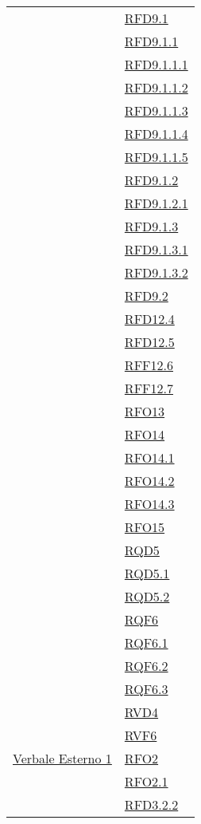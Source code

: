 \begin{longtable}{|>{\centering}m{5cm}|m{5cm}<{\centering}|}
& \hyperlink{RFD9.1}{RFD9.1}\\
& \hyperlink{RFD9.1.1}{RFD9.1.1}\\
& \hyperlink{RFD9.1.1.1}{RFD9.1.1.1}\\
& \hyperlink{RFD9.1.1.2}{RFD9.1.1.2}\\
& \hyperlink{RFD9.1.1.3}{RFD9.1.1.3}\\
& \hyperlink{RFD9.1.1.4}{RFD9.1.1.4}\\
& \hyperlink{RFD9.1.1.5}{RFD9.1.1.5}\\
& \hyperlink{RFD9.1.2}{RFD9.1.2}\\
& \hyperlink{RFD9.1.2.1}{RFD9.1.2.1}\\
& \hyperlink{RFD9.1.3}{RFD9.1.3}\\
& \hyperlink{RFD9.1.3.1}{RFD9.1.3.1}\\
& \hyperlink{RFD9.1.3.2}{RFD9.1.3.2}\\
& \hyperlink{RFD9.2}{RFD9.2}\\
& \hyperlink{RFD12.4}{RFD12.4}\\
& \hyperlink{RFD12.5}{RFD12.5}\\
& \hyperlink{RFF12.6}{RFF12.6}\\
& \hyperlink{RFF12.7}{RFF12.7}\\
& \hyperlink{RFO13}{RFO13}\\
& \hyperlink{RFO14}{RFO14}\\
& \hyperlink{RFO14.1}{RFO14.1}\\
& \hyperlink{RFO14.2}{RFO14.2}\\
& \hyperlink{RFO14.3}{RFO14.3}\\
& \hyperlink{RFO15}{RFO15}\\
& \hyperlink{RQD5}{RQD5}\\
& \hyperlink{RQD5.1}{RQD5.1}\\
& \hyperlink{RQD5.2}{RQD5.2}\\
& \hyperlink{RQF6}{RQF6}\\
& \hyperlink{RQF6.1}{RQF6.1}\\
& \hyperlink{RQF6.2}{RQF6.2}\\
& \hyperlink{RQF6.3}{RQF6.3}\\
& \hyperlink{RVD4}{RVD4}\\
& \hyperlink{RVF6}{RVF6}\\ \hline
\hyperlink{Verbale Esterno 1}{Verbale Esterno 1} & \hyperlink{RFO2}{RFO2}\\
& \hyperlink{RFO2.1}{RFO2.1}\\
& \hyperlink{RFD3.2.2}{RFD3.2.2}\\

\end{longtable}
